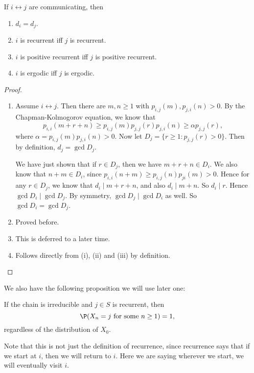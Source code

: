 \documentclass[a4paper]{article}
\begin{document}
\begin{thm}
  If $i \leftrightarrow j$ are communicating, then
  \begin{enumerate}
    \item $d_i = d_j$.
    \item $i$ is recurrent iff $j$ is recurrent.
    \item $i$ is positive recurrent iff $j$ is positive recurrent.
    \item $i$ is ergodic iff $j$ is ergodic.
  \end{enumerate}
\end{thm}

\begin{proof}\leavevmode
  \begin{enumerate}
    \item Assume $i \leftrightarrow j$. Then there are $m, n \geq 1$ with $p_{i, j}(m), p_{j, i}(n) > 0$. By the Chapman-Kolmogorov equation, we know that
      \[
        p_{i, i}(m + r + n) \geq p_{i, j}(m)p_{j, j}(r)p_{j, i}(n) \geq \alpha p_{j, j}(r),
      \]
      where $\alpha = p_{i, j}(m) p_{j, i}(n) > 0$. Now let $D_j = \{r \geq 1: p_{j, j}(r) > 0\}$. Then by definition, $d_j = \gcd D_j$.

      We have just shown that if $r \in D_j$, then we have $m + r + n \in D_i$. We also know that $n + m \in D_i$, since $p_{i, i}(n + m) \geq p_{i, j}(n)p_{ji}(m) > 0$. Hence for any $r \in D_j$, we know that $d_i \mid m + r + n$, and also $d_i \mid m + n$. So $d_i \mid r$. Hence $\gcd D_i \mid \gcd D_j$. By symmetry, $\gcd D_j \mid \gcd D_i$ as well. So $\gcd D_i = \gcd D_j$.
    \item Proved before.
    \item This is deferred to a later time.
    \item Follows directly from (i), (ii) and (iii) by definition.
  \end{enumerate}
\end{proof}

We also have the following proposition we will use later one:
\begin{prop}
  If the chain is irreducible and $j \in S$ is recurrent, then
  \[
    \P(X_n = j\text{ for some }n \geq 1) = 1,
  \]
  regardless of the distribution of $X_0$.
\end{prop}
Note that this is not just the definition of recurrence, since recurrence says that if we start at $i$, then we will return to $i$. Here we are saying wherever we start, we will eventually visit $i$.
\end{document}
